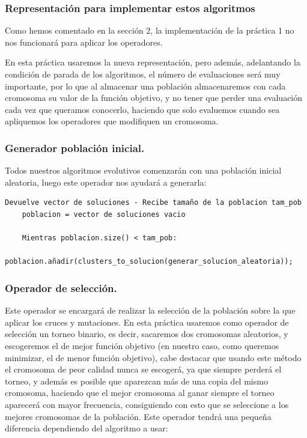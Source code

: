\documentclass[12pt, spanish]{article}
\begin{document}
\subsubsection{Representación para implementar estos algoritmos}

Como hemos comentado en la sección 2, la implementación de la práctica 1 no nos funcionará para aplicar los operadores.

En esta práctica usaremos la nueva representación, pero además, adelantando la condición de parada de los algoritmos, el número de evaluaciones será muy importante, por lo que al almacenar una población almacenaremos con cada cromosoma su valor de la función objetivo, y no tener que perder una evaluación cada vez que queramos conocerlo, haciendo que solo evaluemos cuando sea apliquemos los operadores que modifiquen un cromosoma.

\subsubsection{Generador población inicial.}

Todos nuestros algoritmos evolutivos comenzarán con una población inicial aleatoria, luego este operador nos ayudará a generarla:

\begin{lstlisting}
Devuelve vector de soluciones - Recibe tamaño de la poblacion tam_pob
	poblacion = vector de soluciones vacio
	
	Mientras poblacion.size() < tam_pob:
		poblacion.añadir(clusters_to_solucion(generar_solucion_aleatoria));
\end{lstlisting}

\subsubsection{Operador de selección.}

Este operador se encargará de realizar la selección de la población sobre la que aplicar los cruces y mutaciones. En esta práctica usaremos como operador de selección un torneo binario, es decir, sacaremos dos cromosomas aleatorios, y escogeremos el de mejor función objetivo (en nuestro caso, como queremos minimizar, el de menor función objetivo), cabe destacar que usando este método el cromosoma de peor calidad nunca se escogerá, ya que siempre perderá el torneo, y además es posible que aparezcan más de una copia del mismo cromosoma, haciendo que el mejor cromosoma al ganar siempre el torneo aparecerá con mayor frecuencia, consiguiendo con esto que se seleccione a los mejores cromosomas de la población. Este operador tendrá una pequeña diferencia dependiendo del algoritmo a usar:
\end{document}

